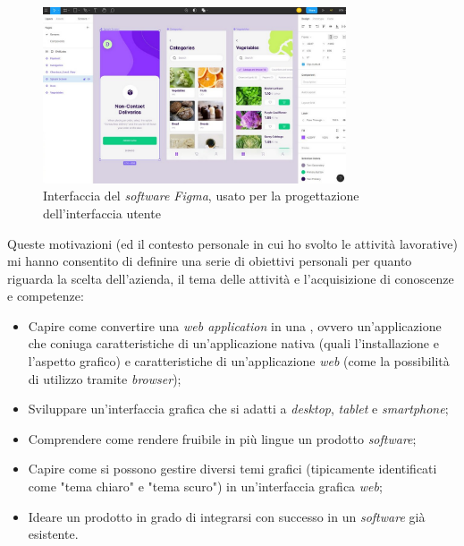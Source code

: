 \begin{figure}[H]
    \centering
    \includegraphics[width=0.8\textwidth]{images/figma-editor.jpg}
    \caption[Interfaccia del \textit{software Figma}]{Interfaccia del \textit{software Figma}, usato per la progettazione dell'interfaccia utente\footnotemark}
\end{figure}
\label{sec:obiettivi-personali}
Queste motivazioni (ed il contesto personale in cui ho svolto le attività lavorative) mi hanno consentito di definire una serie di obiettivi personali per quanto riguarda la scelta dell'azienda, il tema delle attività e l'acquisizione di conoscenze e competenze:
\begin{itemize}
    \item Capire come convertire una \textit{web application} in una , ovvero un'applicazione che coniuga caratteristiche di un'applicazione nativa (quali l'installazione e l'aspetto grafico) e caratteristiche di un'applicazione \textit{web} (come la possibilità di utilizzo tramite \textit{browser});
    \item Sviluppare un'interfaccia grafica che si adatti a \textit{desktop}, \textit{tablet} e \textit{smartphone};
    \item Comprendere come rendere fruibile in più lingue un prodotto \textit{software};
    \item Capire come si possono gestire diversi temi grafici (tipicamente identificati come "tema chiaro" e "tema scuro") in un'interfaccia grafica \textit{web};
    \item Ideare un prodotto in grado di integrarsi con successo in un \textit{software} già esistente.
\end{itemize}
